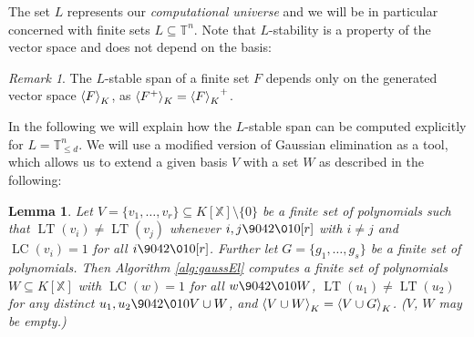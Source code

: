 \documentclass[11pt,oneside,english]{amsart}
\makeatletter
\numberwithin{equation}{section}
\numberwithin{figure}{section}
\theoremstyle{plain}
\theoremstyle{definition}
\theoremstyle{definition}
\theoremstyle{remark}
\newtheorem{rem}[thm]{Remark}
\theoremstyle{plain}
\newtheorem{lem}[thm]{Lemma}
\theoremstyle{plain}
\theoremstyle{plain}
\theoremstyle{problem@}
\makeatother
\begin{document}
The set $L$ represents our \emph{computational universe} and we will
be in particular concerned with finite sets $L\subseteq{\mathbb{T}}^{n}$. Note
that $L$-stability is a property of the vector space and does not
depend on the basis:
\begin{rem}
\label{rem:stableForVR}
The \(L\)-stable span of a finite set \(F\) depends only on
the generated vector space \({{\left\langle {F}\right\rangle}\sb{K}}\), as \({{\left\langle {F^{+}}\right\rangle}\sb{K}} = {{\left\langle {F}\right\rangle}\sb{K}}^{+}\). 
\end{rem}

In the following we will explain how the $L$-stable span can be computed
explicitly for $L={\mathbb{T}}_{\leq d}^{n}$. We will use a modified version
of Gaussian elimination as a tool, which allows us to extend a given
basis $V$ with a set $W$ as described in the following:
\begin{lem}
\label{lem:borderGauss}\cite[Lemma 12]{kehrein2006cbb} Let $V=\{v_{1},\dots,v_{r}\}\subseteq {K[\mathbb{X}]} \setminus\{0\}$
be a finite set of polynomials such that $\operatorname{LT}(v_{i})\neq\operatorname{LT}(v_{j})$
whenever $i,j{\9042\010}[r]$ with $i\neq j$ and $\operatorname{LC}(v_{i})=1$ for all
$i{\9042\010}[r]$. Further let $G=\{g_{1},\dots,g_{s}\}$ be a finite set
of polynomials. Then Algorithm \ref{alg:gaussEl} computes a finite
set of polynomials $W\subseteq {K[\mathbb{X}]}$ with $\operatorname{LC}(w)=1$ for all $w{\9042\010} W$,
$\operatorname{LT}(u_{1})\neq\operatorname{LT}(u_{2})$ for any distinct $u_{1},u_{2}{\9042\010} V\cup W$,
and ${{\left\langle {V\cup W}\right\rangle}\sb{K}}={{\left\langle {V\cup G}\right\rangle}\sb{K}}$. ($V$, $W$
may be empty.)\end{lem}
\end{document}
